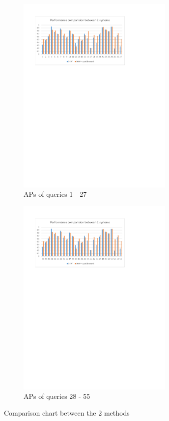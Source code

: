 \begin{figure}
  
    \begin{subfigure}{.5\textwidth}
        \centering
        \includegraphics[width=3.0in]{ap1.pdf}
        \caption{APs of queries 1 - 27}
    \end{subfigure}
        
    \begin{subfigure}{.5\textwidth}
        \centering
        \includegraphics[width=3.0in]{ap2.pdf}
        \caption{APs of queries 28 - 55}
    \end{subfigure}
        
    \caption{Comparison chart between the 2 methods}
    \label{fig:ap_chart}
\end{figure}
